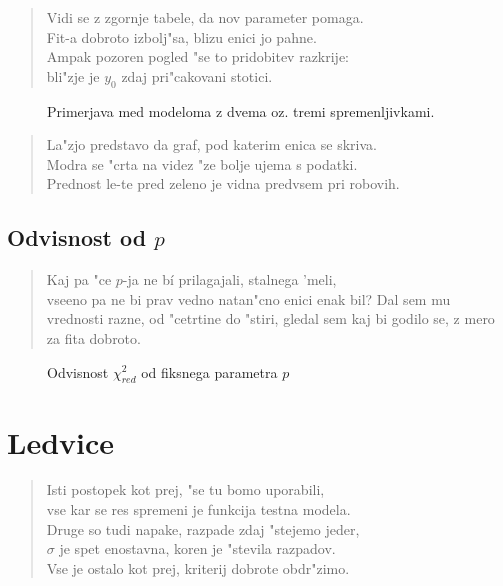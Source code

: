 \documentclass[a4paper,10pt]{article}
\begin{document}
\begin{verse}
Vidi se z zgornje tabele, da nov parameter pomaga. \\
Fit-a dobroto izbolj"sa, blizu enici jo pahne. \\
Ampak pozoren pogled "se to pridobitev razkrije: \\
bli"zje je $y_0$ zdaj pri"cakovani stotici. 
\end{verse}

\begin{figure}
 
  \caption{Primerjava med modeloma z dvema oz. tremi spremenljivkami. }
  \label{fig:farmacija}
\end{figure}

\begin{verse}
 La"zjo predstavo da graf, pod katerim enica se skriva. \\
 Modra se "crta na videz "ze bolje ujema s podatki. \\
 Prednost le-te pred zeleno je vidna predvsem pri robovih. 
\end{verse}

\subsection{Odvisnost od $p$}
\begin{verse}
 Kaj pa "ce $p$-ja ne b\'i prilagajali, stalnega 'meli, \\
 vseeno pa ne bi prav vedno natan"cno enici enak bil?
 Dal sem mu vrednosti razne, od "cetrtine do "stiri,
 gledal sem kaj bi godilo se, z mero za fita dobroto. 
\end{verse}

\begin{figure}
 
\caption{Odvisnost $\chi^2_{red}$ od fiksnega parametra $p$ }
\label{fig:farmacija-hi}
\end{figure}

\section{Ledvice}
\begin{verse}
 Isti postopek kot prej, "se tu bomo uporabili, \\
 vse kar se res spremeni je funkcija testna modela. \\
 Druge so tudi napake, razpade zdaj "stejemo jeder, \\
 $\sigma$ je spet enostavna, koren je "stevila razpadov. \\
 Vse je ostalo kot prej, kriterij dobrote obdr"zimo. 
\end{verse}
\end{document}

